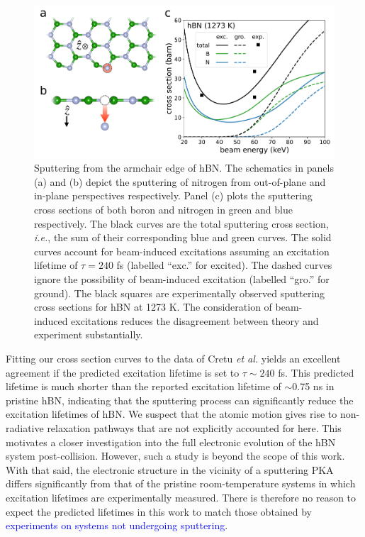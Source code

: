 \documentclass[twoside,twocolumn,9pt]{article}
\begin{document}
\begin{figure} 
  \centering
  \includegraphics[width=.85\textwidth]{figures/edgeCross.pdf}
  \caption{
    Sputtering from the armchair edge of hBN.
    The schematics in panels (a) and (b) depict the sputtering of nitrogen from
    out-of-plane and in-plane perspectives respectively.
    Panel (c) plots the sputtering cross sections of both boron and nitrogen in
    green and blue respectively.
    The black curves are the total sputtering cross section, \textit{i.e.}, the sum of
    their corresponding blue and green curves.
    The solid curves account for beam-induced excitations assuming an
    excitation lifetime of $\tau=240$ fs (labelled ``exc.'' for excited).
    The dashed curves ignore the possibility of beam-induced excitation
    (labelled ``gro.'' for ground).
    The black squares are experimentally observed sputtering cross sections
    for hBN at 1273 K.\cite{Cretu2015}
    The consideration of beam-induced excitations reduces the disagreement
    between theory and experiment substantially.
  }
  \label{fig:edgeCross}
\end{figure}

Fitting our cross section curves to the data of Cretu \textit{et al.} yields an
excellent agreement if the predicted excitation lifetime is set to $\tau \sim
240$ fs.
This predicted lifetime is much shorter than the reported excitation lifetime
of $\sim$0.75 ns in pristine hBN,\cite{Li2016b} indicating that the sputtering
process can significantly reduce the excitation lifetimes of hBN.
We suspect that the atomic motion gives rise to non-radiative relaxation
pathways that are not explicitly accounted for here. 
This motivates a closer investigation into the full electronic evolution of
the hBN system post-collision.
However, such a study is beyond the scope of this work.
With that said, the electronic structure in the vicinity of a sputtering PKA
differs significantly from that of the pristine room-temperature systems in
which excitation lifetimes are experimentally measured.
There is therefore no reason to expect the predicted lifetimes in this
work to match those obtained by \textcolor{blue}{experiments on systems not
undergoing sputtering}.
\end{document}
